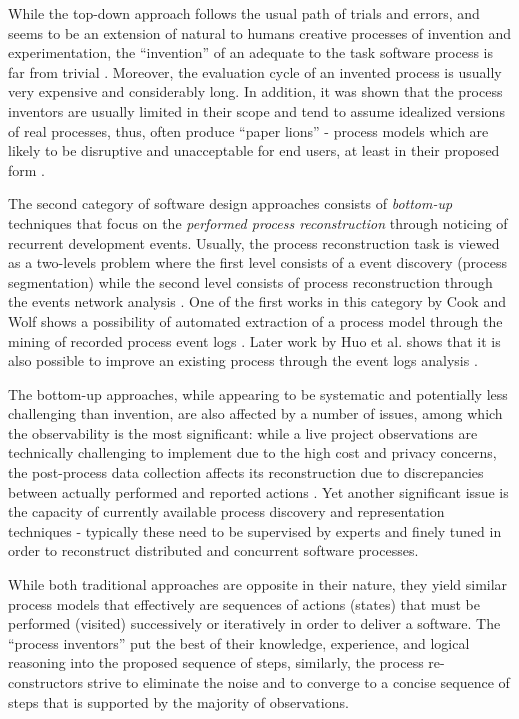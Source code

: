 While the top-down approach follows the usual path of trials and errors, and seems to be an 
extension of natural to humans creative processes of invention and experimentation, 
the ``invention'' of an adequate to the task software process is far from trivial 
\cite{citeulike:5043104} \cite{citeulike:1986013}. 
Moreover, the evaluation cycle of an invented process is usually very expensive and considerably long.
In addition, it was shown that the process inventors are usually limited in their scope and tend to 
assume idealized versions of real processes, thus, often produce ``paper lions'' - process models which are 
likely to be disruptive and unacceptable for end users, at least in their proposed form \cite{citeulike:9758924}.

The second category of software design approaches consists of \textit{bottom-up} techniques that focus 
on the \textit{performed process reconstruction} through noticing of recurrent development events. 
Usually, the process reconstruction task is viewed as a two-levels problem where the first level 
consists of a event discovery (process segmentation) while the second level consists of process 
reconstruction through the events network analysis \cite{citeulike:2703162}.
One of the first works in this category by Cook and Wolf shows a possibility of automated extraction 
of a process model through the mining of recorded process event logs 
\cite{citeulike:328044} \cite{citeulike:5120757} \cite{citeulike:5128143}. 
Later work by Huo et al. shows that it is also possible to improve an existing process
through the event logs analysis \cite{citeulike:7691059} \cite{citeulike:7690766}. 

The bottom-up approaches, while appearing to be systematic and potentially less challenging than invention, 
are also affected by a number of issues, among which the observability is the most significant: 
while a live project observations are technically challenging to implement due to the high cost and 
privacy concerns, the post-process data collection affects its reconstruction due to 
discrepancies between actually performed and reported actions \cite{citeulike:7691059}. 
Yet another significant issue is the capacity of currently available process discovery and representation 
techniques - typically these need to be supervised by experts and finely tuned in order to reconstruct 
distributed and concurrent software processes. 

While both traditional approaches are opposite in their nature, they yield similar process models that 
effectively are sequences of actions (states) that must be performed (visited) successively or iteratively 
in order to deliver a software. The ``process inventors'' put the best of their knowledge, experience, 
and logical reasoning into the proposed sequence of steps, similarly, the process re-constructors 
strive to eliminate the noise and to converge to a concise sequence of steps that is supported by the 
majority of observations. 

